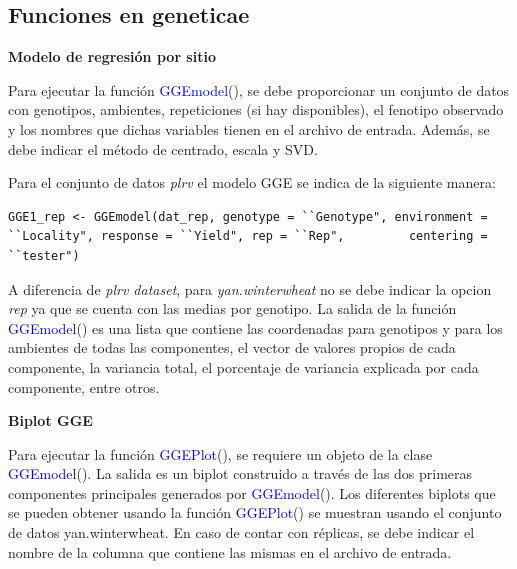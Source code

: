 \subsection{Funciones en geneticae}

\textbf{Modelo de regresión por sitio}

Para ejecutar la función \textcolor{blue}{GGEmodel}(), se debe proporcionar un conjunto de datos con genotipos, ambientes, repeticiones (si hay disponibles), el fenotipo observado y los nombres que dichas variables tienen en el archivo de entrada. Además, se debe indicar el método de centrado, escala y SVD. 

Para el conjunto de datos \emph{plrv} el modelo GGE se indica de la siguiente manera:

		\begin{tcolorbox}[colframe=aurometalsaurus,colback=backcolour,colbacklower=white,
   				width=1\linewidth,
    			height=0.1\linewidth,
    			boxsep=-3mm]
			\begin{lstlisting}
GGE1_rep <- GGEmodel(dat_rep, genotype = ``Genotype", environment = ``Locality", response = ``Yield", rep = ``Rep", 		centering = ``tester")
			\end{lstlisting}
		\end{tcolorbox}
A diferencia de \emph{plrv dataset}, para \emph{yan.winterwheat} no se debe indicar la opcion \emph{rep} ya que se cuenta con las medias por genotipo.
La salida de la función \textcolor{blue}{GGEmodel}() es una lista que contiene las coordenadas para genotipos y para los ambientes de todas las componentes, el vector de valores propios de cada componente, la variancia total, el porcentaje de variancia explicada por cada componente, entre otros.

\textbf{Biplot GGE}

Para ejecutar la función \textcolor{blue}{GGEPlot}(), se requiere un objeto de la clase \textcolor{blue}{GGEmodel}(). La salida es un biplot construido a través de las dos primeras componentes principales generados por \textcolor{blue}{GGEmodel}().
Los diferentes biplots que se pueden obtener usando la función \textcolor{blue}{GGEPlot}() se muestran usando el conjunto de datos yan.winterwheat. En caso de contar con réplicas, se debe indicar el nombre de la columna que contiene las mismas en el archivo de entrada.

